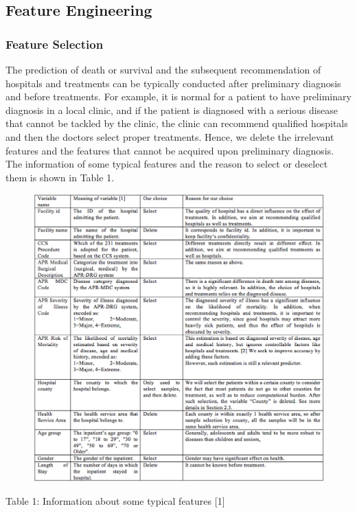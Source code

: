 \documentclass{article}
\begin{document}
\subsection{Feature Engineering}
\subsubsection{Feature Selection}
The prediction of death or survival and the subsequent recommendation of hospitals and treatments can be typically conducted after preliminary diagnosis and before treatments. For example, it is normal for a patient to have preliminary diagnosis in a local clinic, and if the patient is diagnosed with a serious disease that cannot be tackled by the clinic, the clinic can recommend qualified hospitals and then the doctors select proper treatments. Hence, we delete the irrelevant features and the features that cannot be acquired upon preliminary diagnosis. The information of some typical features and the reason to select or deselect them is shown in Table 1.\\
\begin{figure}[H]
\begin{center}
\includegraphics[width=5.0in]{table1_variable_information.png}
\end{center}
\end{figure}
\centerline
{Table 1: Information about some typical features [1]}
\end{document}
